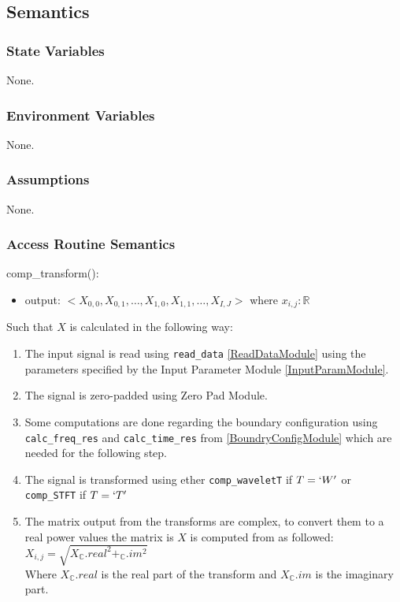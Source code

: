 \documentclass[12pt, titlepage]{article}
\begin{document}
\subsection{Semantics}

\subsubsection{State Variables}
None.

\subsubsection{Environment Variables}
None.

\subsubsection{Assumptions}
None.

\subsubsection{Access Routine Semantics}

\noindent comp\_transform():
\begin{itemize}
\item output: $<X_{0,0},X_{0,1},\dots, X_{1,0},X_{1,1},\dots, X_{I,J}>$ where $ x_{i,j}:\mathbb{R}$
\end{itemize}
Such that $X$ is calculated in the following way:
\begin{enumerate}
\item The input signal is read using \texttt{read\_data} \ref{ReadDataModule} using the parameters specified by the Input Parameter Module \ref{InputParamModule}.
\item The signal is zero-padded using Zero Pad Module.
\item Some computations are done regarding the boundary configuration using \texttt{calc\_freq\_res} and \texttt{calc\_time\_res} from \ref{BoundryConfigModule} which are needed for the following step.
\item The signal is transformed using ether \texttt{comp\_waveletT} if $T = `W'$ or \texttt{comp\_STFT} if $T = `T'$ 
\item The matrix output from the transforms are complex, to convert them to a real power values the matrix is $X$ is computed from as followed:\\
$X_{i,j} = \sqrt{X_{\mathbb{C}}.real^2 + _{\mathbb{C}}.im^2}$\\
Where $X_\mathbb{C}.real$ is the real part of the transform and $X_\mathbb{C}.im$ is the imaginary part.

\end{enumerate}
\end{document}
